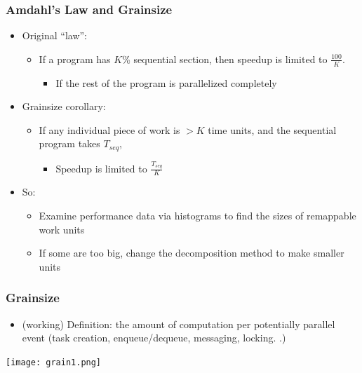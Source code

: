 \documentclass{beamer}
\begin{document}
\begin{frame}
  \frametitle{Amdahl's Law and Grainsize}
  \begin{itemize}
    \item Original ``law'':
      \begin{itemize}
      \item If a program has $K$\% sequential section, then speedup is limited
        to $\frac{100}{K}$.
        \begin{itemize}
        \item If the rest of the program is parallelized completely
        \end{itemize}
      \end{itemize}
    \item Grainsize corollary:
      \begin{itemize}
      \item If any individual piece of work is $> K$ time units, and the
        sequential program takes $T_{seq}$, 
        \begin{itemize}
        \item Speedup is limited to $\frac{T_{seq}}{K}$
        \end{itemize}
      \end{itemize}
    \item So:
      \begin{itemize}
      \item Examine performance data via histograms to find the sizes of
        remappable work units
      \item If some are too big, change the decomposition method to make
        smaller units
      \end{itemize}
  \end{itemize}
\end{frame}

\begin{frame}
  \frametitle{Grainsize}
  \begin{itemize}
    \item (working) Definition: the amount of computation per potentially
      parallel event (task creation, enqueue/dequeue, messaging, locking. .)
  \end{itemize}
  \begin{center} \texttt{[image: grain1.png]} \end{center}
\end{frame}
\end{document}
